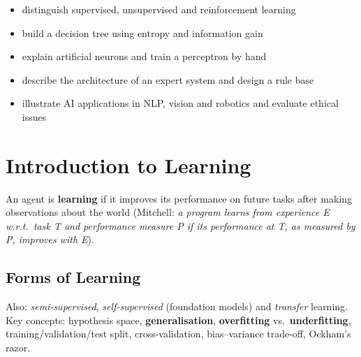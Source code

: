 
\begin{outcome}
\begin{itemize}
\item distinguish supervised, unsupervised and reinforcement learning 
\item build a decision tree using entropy and information gain 
\item explain artificial neurons and train a perceptron by hand 
\item describe the architecture of an expert system and design a rule base 
\item illustrate AI applications in NLP, vision and robotics and evaluate ethical issues 
\end{itemize}
\end{outcome}

\section{Introduction to Learning}
An agent is \textbf{learning} if it improves its performance on future tasks after making observations about the world (Mitchell: \emph{a program learns from experience E w.r.t.\ task T and performance measure P if its performance at T, as measured by P, improves with E}).

\subsection{Forms of Learning}
\begin{center}
\end{center}
Also: \emph{semi-supervised}, \emph{self-supervised} (foundation models) and \emph{transfer} learning. Key concepts: hypothesis space, \textbf{generalisation}, \textbf{overfitting} vs.\ \textbf{underfitting}, training/validation/test split, cross-validation, bias--variance trade-off, Ockham's razor.

